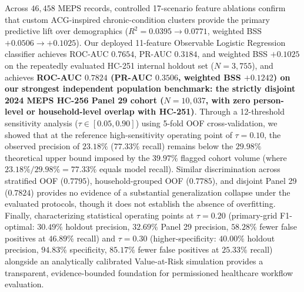 \documentclass[runningheads]{llncs}
\begin{document}
Across $46,458$ MEPS records, controlled 17-scenario feature ablations confirm that custom ACG-inspired chronic-condition clusters provide the primary predictive lift over demographics ($R^2 = 0.0395 \to 0.0771$, weighted BSS $+0.0506 \to +0.1025$). Our deployed 11-feature Observable Logistic Regression classifier achieves ROC-AUC $0.7654$, PR-AUC $0.3184$, and weighted BSS $+0.1025$ on the repeatedly evaluated HC-251 internal holdout set ($N=3,755$), and achieves \textbf{ROC-AUC $0.7824$ (PR-AUC $0.3506$, weighted BSS $+0.1242$) on our strongest independent population benchmark: the strictly disjoint 2024 MEPS HC-256 Panel 29 cohort ($N=10,037$, with zero person-level or household-level overlap with HC-251)}. Through a 12-threshold sensitivity analysis ($\tau \in [0.05, 0.90]$) using 5-fold OOF cross-validation, we showed that at the reference high-sensitivity operating point of $\tau = 0.10$, the observed precision of $23.18\%$ ($77.33\%$ recall) remains below the $29.98\%$ theoretical upper bound imposed by the $39.97\%$ flagged cohort volume (where $23.18\% / 29.98\% = 77.33\%$ equals model recall). Similar discrimination across stratified OOF ($0.7795$), household-grouped OOF ($0.7785$), and disjoint Panel 29 ($0.7824$) provides no evidence of a substantial generalization collapse under the evaluated protocols, though it does not establish the absence of overfitting. Finally, characterizing statistical operating points at $\tau = 0.20$ (primary-grid F1-optimal: $30.49\%$ holdout precision, $32.69\%$ Panel 29 precision, $58.28\%$ fewer false positives at $46.89\%$ recall) and $\tau = 0.30$ (higher-specificity: $40.00\%$ holdout precision, $94.83\%$ specificity, $85.17\%$ fewer false positives at $25.33\%$ recall) alongside an analytically calibrated Value-at-Risk simulation provides a transparent, evidence-bounded foundation for permissioned healthcare workflow evaluation.



\end{document}

